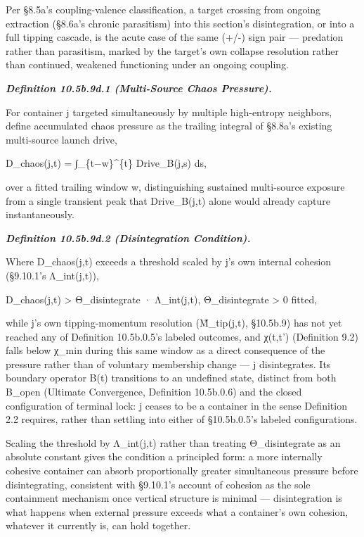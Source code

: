 \documentclass[
]{article}
\begin{document}
Per §8.5a's coupling-valence classification, a target crossing from
ongoing extraction (§8.6a's chronic parasitism) into this section's
disintegration, or into a full tipping cascade, is the acute case of the
same (+/-) sign pair --- predation rather than parasitism, marked by the
target's own collapse resolution rather than continued, weakened
functioning under an ongoing coupling.

\emph{\textbf{Definition 10.5b.9d.1 (Multi-Source Chaos Pressure).}}

For container j targeted simultaneously by multiple high-entropy
neighbors, define accumulated chaos pressure as the trailing integral of
§8.8a's existing multi-source launch drive,

D\_chaos(j,t) = ∫\_\{t−w\}\^{}\{t\} Drive\_B(j,s) ds,

over a fitted trailing window w, distinguishing sustained multi-source
exposure from a single transient peak that Drive\_B(j,t) alone would
already capture instantaneously.

\emph{\textbf{Definition 10.5b.9d.2 (Disintegration Condition).}}

Where D\_chaos(j,t) exceeds a threshold scaled by j's own internal
cohesion (§9.10.1's Λ\_int(j,t)),

D\_chaos(j,t) \textgreater{} Θ\_disintegrate · Λ\_int(j,t),
Θ\_disintegrate \textgreater{} 0 fitted,

while j's own tipping-momentum resolution (M̃\_tip(j,t), §10.5b.9) has
not yet reached any of Definition 10.5b.0.5's labeled outcomes, and
χ(t,t') (Definition 9.2) falls below χ\_min during this same window as a
direct consequence of the pressure rather than of voluntary membership
change --- j disintegrates. Its boundary operator B(t) transitions to an
undefined state, distinct from both B\_open (Ultimate Convergence,
Definition 10.5b.0.6) and the closed configuration of terminal lock: j
ceases to be a container in the sense Definition 2.2 requires, rather
than settling into either of §10.5b.0.5's labeled configurations.

Scaling the threshold by Λ\_int(j,t) rather than treating
Θ\_disintegrate as an absolute constant gives the condition a principled
form: a more internally cohesive container can absorb proportionally
greater simultaneous pressure before disintegrating, consistent with
§9.10.1's account of cohesion as the sole containment mechanism once
vertical structure is minimal --- disintegration is what happens when
external pressure exceeds what a container's own cohesion, whatever it
currently is, can hold together.
\end{document}
